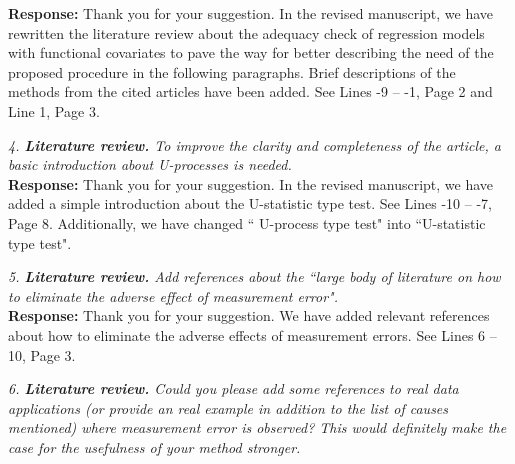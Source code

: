 \documentclass[12pt]{report}
\begin{document}
\begin{description}
{ \bf Response: } Thank you for your suggestion. In the revised manuscript, we have rewritten the literature review about the adequacy check of regression models
with functional covariates to  pave the way for better describing the need of the
proposed procedure  in the following paragraphs. Brief descriptions of  the methods from the cited
articles have been added. See Lines -9 -- -1, Page 2  and Line 1, Page 3. \\


\item {{ \textcolor[rgb]{0.00,0.50,1.00}{\em 4. {\bf Literature review.} To improve the clarity and completeness of the article, a basic introduction
about U-processes is needed. }}}\\

{ \bf Response: } Thank you for your suggestion. In the revised manuscript, we have added a simple introduction about the U-statistic type test. See Lines -10 -- -7, Page 8.  Additionally, we have changed `` U-process type test" into ``U-statistic type test".\\

\item {{ \textcolor[rgb]{0.00,0.50,1.00}{\em 5. {\bf Literature review.} Add references about the ``large body of literature on how to eliminate
the adverse effect of measurement error". }}}\\

{ \bf Response: } Thank you for your suggestion. We have added  relevant references about how to eliminate the adverse effects of measurement errors. See Lines 6 -- 10, Page 3.\\

\item {{ \textcolor[rgb]{0.00,0.50,1.00}{\em 6. {\bf Literature review.} Could you please add some references to real data applications (or
provide an real example in addition to the list of causes mentioned) where measurement error
is observed? This would definitely make the case for the usefulness of your method stronger. }}}\\




\end{description}
\end{document}

